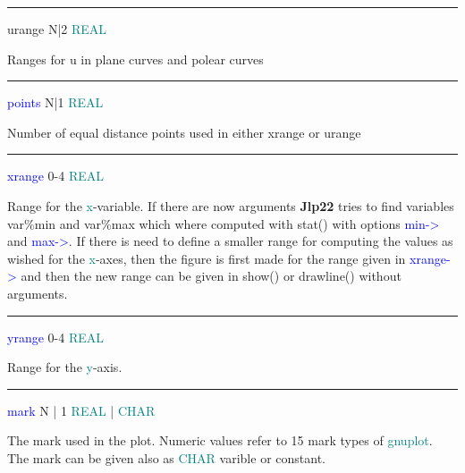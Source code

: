 \vspace{0.3cm} 
\hrule 
\vspace{0.3cm} 
\noindent urange  \tabto{3cm} N|2 \tabto{5cm}   \textcolor{teal}{REAL} \tabto{7cm} 
\begin{changemargin}{3cm}{0cm} 
\noindent  Ranges for u in plane curves and polear curves 
\end{changemargin} 
\vspace{0.3cm} 
\hrule 
\vspace{0.3cm} 
\noindent \textcolor{blue}{points} \tabto{3cm} N|1 \tabto{5cm}  \textcolor{teal}{REAL} \tabto{7cm} 
\begin{changemargin}{3cm}{0cm} 
\noindent Number of equal distance points used in either xrange or urange 
 
\end{changemargin} 
\vspace{0.3cm} 
\hrule 
\vspace{0.3cm} 
\noindent \textcolor{blue}{xrange} \tabto{3cm} 0-4 \tabto{5cm}  \textcolor{teal}{REAL} \tabto{7cm} 
\begin{changemargin}{3cm}{0cm} 
\noindent  Range for the \textcolor{teal}{x}-variable. If there are now arguments \textbf{Jlp22} tries to 
find variables var\%min and var\%max which where computed with \textcolor{VioletRed}{stat}() with options \textcolor{blue}{min->} 
and \textcolor{blue}{max->}. If there is need to define a smaller range for computing the values as wished 
for the \textcolor{teal}{x}-axes, then the figure is first made for the range given in \textcolor{blue}{xrange->} and then the new 
range can be given in \textcolor{VioletRed}{show}() or \textcolor{VioletRed}{drawline}() without arguments. 
\end{changemargin} 
\vspace{0.3cm} 
\hrule 
\vspace{0.3cm} 
\noindent \textcolor{blue}{yrange} \tabto{3cm} 0-4 \tabto{5cm}  \textcolor{teal}{REAL} \tabto{7cm} 
\begin{changemargin}{3cm}{0cm} 
\noindent  Range for the \textcolor{teal}{y}-axis. 
\end{changemargin} 
\vspace{0.3cm} 
\hrule 
\vspace{0.3cm} 
\noindent \textcolor{blue}{mark}  \tabto{3cm}  N | 1  \tabto{5cm}   \textcolor{teal}{REAL} | \textcolor{teal}{CHAR}  \tabto{7cm} 
\begin{changemargin}{3cm}{0cm} 
\noindent  The mark used in the plot. 
Numeric values refer to 15 
mark types of \textcolor{teal}{gnuplot}. The mark can be given also as \textcolor{teal}{CHAR} varible or constant. 
\end{changemargin} 
